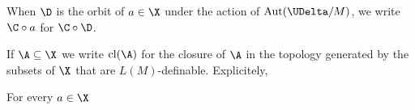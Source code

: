 When $\D$ is the orbit of $a\in\X$ under the action of ${\rm Aut}(\UDelta/M)$, we write $\C\circ a$ for $\C\circ\D$.

If $\A\subseteq\X$ we write ${\rm cl}(\A)$ for the closure of $\A$ in the topology generated by the subsets of $\X$ that are $L(M)$-definable.
Explicitely,






  


\begin{fact}
  For every $a\in\X$\smallskip

\end{fact}

